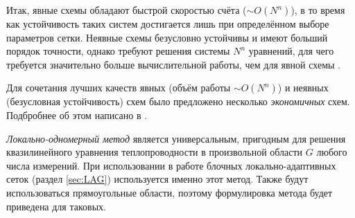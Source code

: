 \newcommand{\valpha}{v_{(\alpha)}}

Итак, явные схемы обладают быстрой скоростью счёта ($\sim O(N^n)$), в то время как устойчивость таких систем достигается лишь при определённом выборе параметров сетки.
Неявные схемы безусловно устойчивы и имеют больший порядок точности, однако требуют решения системы $N^n$ уравнений, для чего требуется значительно больше вычислительной работы, чем для явной схемы \cite{ТихоновСамарский}.

Для сочетания лучших качеств явных (объём работы $\sim O(N^n)$) и неявных (безусловная устойчивость) схем было предложено несколько \emph{экономичных} схем.
Подбробнее об этом написано в \cite{СамарскийТеорияРазностныхСхем, peaceman1955numerical, douglas1955numerical, яненко1959одном, дьяконов1962разностные, самарский1962одном}.

\emph{Локально-одномерный метод} является универсальным, пригодным для решения квазилинейного уравнения теплопроводности в произвольной области $G$ любого числа измерений.
При использовании в работе блочных локально-адаптивных сеток (раздел \ref{sec:LAG}) используется именно этот метод.
Также будут использоваться прямоугольные области, поэтому формулировка метода будет приведена для таковых.

